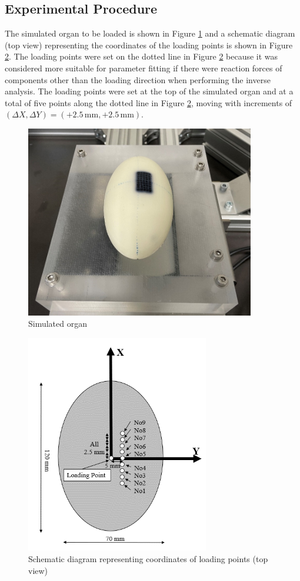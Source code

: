 \subsection*{Experimental Procedure}
The simulated organ to be loaded is shown in Figure \ref{fig:simorganynu} and a schematic diagram (top view) representing the coordinates of the loading points is shown in 
Figure \ref{fig:schemdiagynu}.
The loading points were set on the dotted line in Figure \ref{fig:schemdiagynu} because it was considered more suitable for parameter fitting if there were reaction forces of components other than the loading direction when performing the inverse analysis. The loading points were set at the top of the simulated organ and at a total of five points along the dotted line in
Figure \ref{fig:schemdiagynu}, moving with increments of $(\Delta X, \Delta Y) = (+2.5\,\mathrm{mm}, +2.5\,\mathrm{mm})$.\\
\begin{figure}%
	\centering
   \quad
   \includegraphics[width=10cm]{Images/appendix/ynu/fig2simulatedorgan.png}%
   \caption{Simulated organ}%
   \label{fig:simorganynu}%
\end{figure}
\begin{figure}%
	\centering
   \quad
   \includegraphics[width=8cm]{Images/appendix/ynu/fig3schematicdiagramrepresentingcoordinatesofloadingpoints_topview.png}%
   \caption[Schematic diagram YNU]{Schematic diagram representing coordinates of loading points (top view)}%
   \label{fig:schemdiagynu}%
\end{figure}

